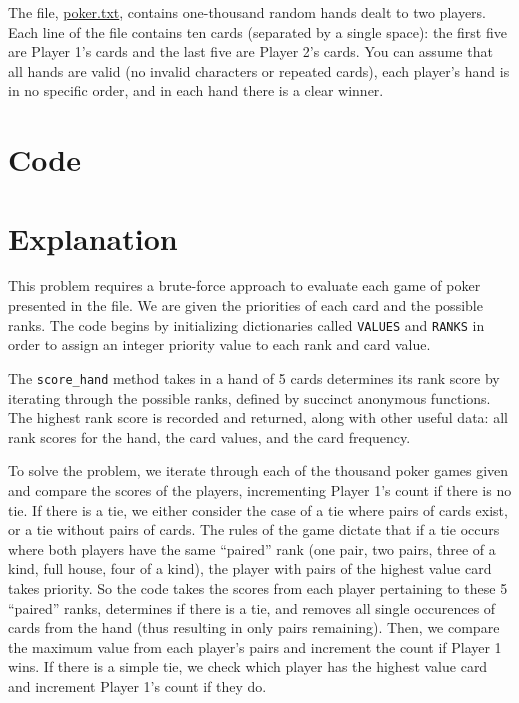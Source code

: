 \documentclass{article}
\begin{document}
The file, \href{project/resources/p054_poker.txt}{poker.txt}, contains
one-thousand random hands dealt to two players. Each line of the file
contains ten cards (separated by a single space): the first five are
Player 1's cards and the last five are Player 2's cards. You can assume
that all hands are valid (no invalid characters or repeated cards), each
player's hand is in no specific order, and in each hand there is a clear
winner.

\newpage

\section{Code}



\section{Explanation}

This problem requires a brute-force approach to evaluate each game of poker presented in the file.
We are given the priorities of each card and the possible ranks. The code begins by initializing dictionaries called \verb|VALUES| and \verb|RANKS|
in order to assign an integer priority value to each rank and card value.

The \verb|score_hand| method takes in a hand of 5 cards determines its rank score by iterating through the possible
ranks, defined by succinct anonymous functions. The highest rank score is recorded and returned, along with other useful data: all rank scores for the hand, the card values, and the card frequency.

To solve the problem, we iterate through each of the thousand poker games given and compare the scores of the players, incrementing Player 1's count if there is no tie.
If there is a tie, we either consider the case of a tie where pairs of cards exist, or a tie without pairs of cards.
The rules of the game dictate that if a tie occurs where both players have the same ``paired'' rank (one pair, two pairs, three of a kind, full house, four of a kind),
the player with pairs of the highest value card takes priority. So the code takes the scores from each player pertaining to these 5 ``paired'' ranks, determines if there is a tie, and
removes all single occurences of cards from the hand (thus resulting in only pairs remaining). Then, we compare the maximum value from each player's pairs and increment the count if Player 1 wins.
If there is a simple tie, we check which player has the highest value card and increment Player 1's count if they do.
\end{document}
